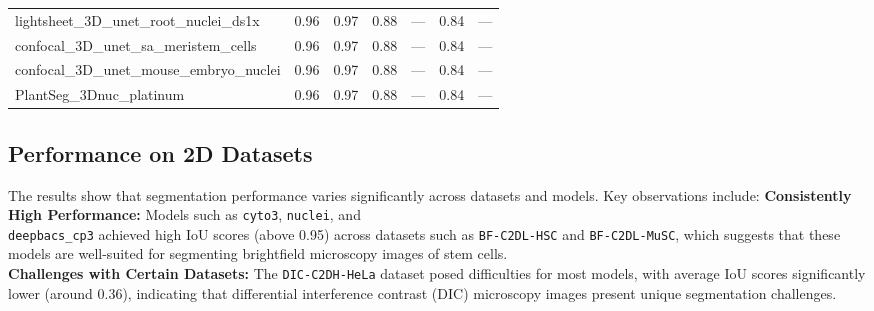 \documentclass[./dissertation.tex]{subfiles}
\begin{document}
\begin{table}
\begin{tabular}{|l|c|c|c|c|c|c|}
        lightsheet\_3D\_unet\_root\_nuclei\_ds1x  & 0.96                                    & 0.97                                        & 0.88                                    & ---                                   & 0.84                                   & ---                                     \\
        confocal\_3D\_unet\_sa\_meristem\_cells   & 0.96                                    & 0.97                                        & 0.88                                    & ---                                   & 0.84                                   & ---                                     \\
        confocal\_3D\_unet\_mouse\_embryo\_nuclei & 0.96                                    & 0.97                                        & 0.88                                    & ---                                   & 0.84                                   & ---                                     \\
        PlantSeg\_3Dnuc\_platinum                 & 0.96                                    & 0.97                                        & 0.88                                    & ---                                   & 0.84                                   & ---                                     \\
        \bottomrule
    \end{tabular}
\end{table}



\subsection{Performance on 2D Datasets}

The results show that segmentation performance varies significantly across datasets and models. Key observations include:
\textbf{Consistently High Performance:} Models such as \texttt{cyto3}, \texttt{nuclei}, and \\ \texttt{deepbacs\_cp3} achieved high IoU scores (above 0.95) across datasets such as \texttt{BF-C2DL-HSC} and \texttt{BF-C2DL-MuSC}, which suggests that these models are well-suited for segmenting brightfield microscopy images of stem cells. \\

\textbf{Challenges with Certain Datasets:} The \texttt{DIC-C2DH-HeLa} dataset posed difficulties for most models, with average IoU scores significantly lower (around 0.36), indicating that differential interference contrast (DIC) microscopy images present unique segmentation challenges. \\
\end{document}
